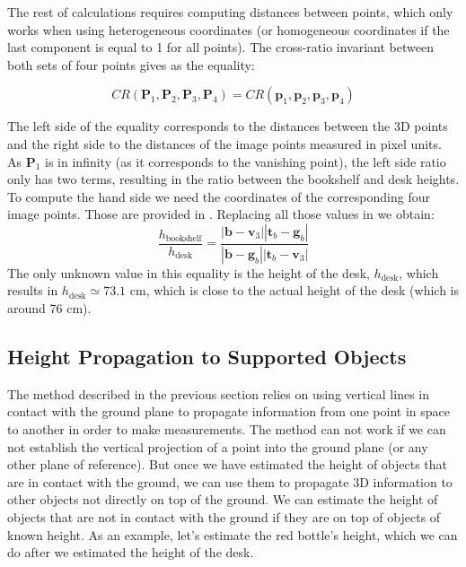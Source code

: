 The rest of calculations requires computing distances between points, which only works when using heterogeneous coordinates (or homogeneous coordinates if the last component is equal to 1 for all points). The cross-ratio invariant between both sets of four points gives as the equality:

\begin{equation}
CR(\mathbf{P}_1,\mathbf{P}_2,\mathbf{P}_3,\mathbf{P}_4) = CR(\mathbf{p}_1,\mathbf{p}_2,\mathbf{p}_3,\mathbf{p}_4)
\label{eq:cross_ratio_shelf_desk}
\end{equation}

The left side of the equality corresponds to the distances between the 3D points and the right side to the distances of the image points measured in pixel units. As $\mathbf{P}_1$ is in infinity (as it corresponds to the vanishing point), the left side ratio only has two terms, resulting in the ratio between the bookshelf and desk heights. To compute the hand side we need the coordinates of the corresponding four image points. Those are provided in \fig{\ref{fig:office_measuring_desk}}. Replacing all those values in \eqn{\ref{eq:cross_ratio_shelf_desk}} we obtain:
\begin{equation}
\frac{h_{\text{bookshelf}}}{h_{\text{desk}}} = 
\frac{\left| \mathbf{b} - \mathbf{v}_3 \right| \left| \mathbf{t}_b - \mathbf{g}_b \right| }{\left| \mathbf{b} - \mathbf{g}_b \right| \left| \mathbf{t}_b - \mathbf{v}_3  \right|}
\end{equation}
The only unknown value in this equality is the height of the desk, $h_{\text{desk}}$, which results in $h_{\text{desk}} \simeq 73.1$ cm, which is close to the actual height of the desk (which is around 76 cm).



\subsection{Height Propagation to Supported Objects}

The method described in the previous section relies on using vertical lines in contact with the ground plane to propagate information from one point in space to another in order to make measurements. The method can not work if we can not establish the vertical projection of a point into the ground plane (or any other plane of reference). But once we have estimated the height of objects that are in contact with the ground, we can use them to propagate 3D information to other objects not directly on top of the ground. We can estimate the height of objects that are not in contact with the ground if they are on top of objects of known height. As an example, let's estimate the red bottle's height, which we can do after we estimated the height of the desk. 

